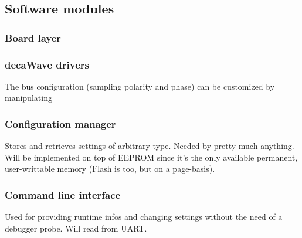 \subsection{Software modules}



\subsubsection{Board layer}


\subsubsection{decaWave drivers}

The bus configuration (sampling polarity and phase) can be customized by manipulating

\subsubsection{Configuration manager}
Stores and retrieves settings of arbitrary type.
Needed by pretty much anything.
Will be implemented on top of EEPROM since it's the only available permanent, user-writtable memory (Flash is too, but on a page-basis).

\subsubsection{Command line interface}
Used for providing runtime infos and changing settings without the need of a debugger probe.
Will read from UART.
